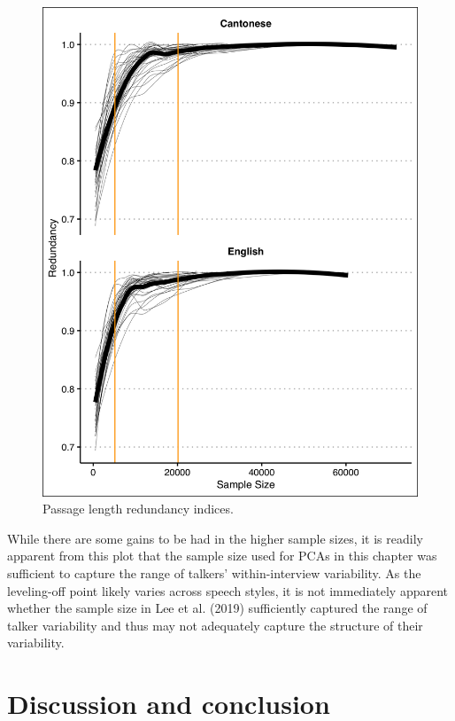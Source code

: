 \begin{figure}[htbp]
    \begin{center}
    \includegraphics[width=\linewidth]{figures/ch3_passagelength.png} 
    \caption{Passage length redundancy indices.}
    \label{ch3:fig:passagelength}
    \end{center}
\end{figure}

While there are some gains to be had in the higher sample sizes, it is readily apparent from this plot that the sample size used for PCAs in this chapter was sufficient to capture the range of talkers' within-interview variability. As the leveling-off point likely varies across speech styles, it is not immediately apparent whether the sample size in Lee et al. (2019) sufficiently captured the range of talker variability and thus may not adequately capture the structure of their variability. 

\section{Discussion and conclusion}\label{ch3:sec:discussion}

